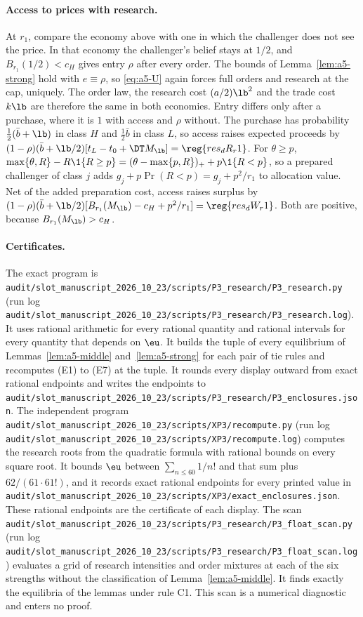 \paragraph{Access to prices with research.}
At \(r_1\), compare the economy above with one in which the challenger does not see the price. In that economy the
challenger's belief stays at \(1/2\), and \(B_{r_1}(1/2)<c_H\) gives entry \(\rho\) after every order. The bounds of
Lemma~\ref{lem:a5-strong} hold with \(e\equiv\rho\), so \eqref{eq:a5-U} again forces full orders and research at the
cap, uniquely. The order law, the research cost \((a/2)\lb^2\) and the trade cost \(k\lb\) are therefore the same in
both economies. Entry differs only after a purchase, where it is \(1\) with access and \(\rho\) without. The purchase
has probability \(\tfrac12(\bar b+\lb)\) in class \(H\) and \(\tfrac12\bar b\) in class \(L\), so access raises
expected proceeds by \((1-\rho)(\bar b+\lb/2)[t_L-t_0+\DT M_{\lb}]=\reg{res_dR_r1}\). For \(\theta\ge p\),
\(\max\{\theta,R\}-R\1\{R\ge p\}=(\theta-\max\{p,R\})_++p\1\{R<p\}\), so a prepared challenger of class \(j\) adds
\(g_j+p\Pr(R<p)=g_j+p^2/r_1\) to allocation value. Net of the added preparation cost, access raises surplus by
\((1-\rho)(\bar b+\lb/2)[B_{r_1}(M_{\lb})-c_H+p^2/r_1]=\reg{res_dW_r1}\). Both are positive, because
\(B_{r_1}(M_{\lb})>c_H\).

\paragraph{Certificates.}
The exact program is \nolinkurl{audit/slot_manuscript_2026_10_23/scripts/P3_research/P3_research.py} (run log
\nolinkurl{audit/slot_manuscript_2026_10_23/scripts/P3_research/P3_research.log}). It uses rational arithmetic for
every rational quantity and rational intervals for every quantity that depends on \(\eu\). It builds the tuple of
every equilibrium of Lemmas~\ref{lem:a5-middle} and~\ref{lem:a5-strong} for each pair of tie rules and recomputes
(E1) to (E7) at the tuple. It rounds every display outward from exact rational endpoints and writes the endpoints to
\nolinkurl{audit/slot_manuscript_2026_10_23/scripts/P3_research/P3_enclosures.json}. The independent program
\nolinkurl{audit/slot_manuscript_2026_10_23/scripts/XP3/recompute.py} (run log
\nolinkurl{audit/slot_manuscript_2026_10_23/scripts/XP3/recompute.log}) computes the research roots from the
quadratic formula with rational bounds on every square root. It bounds \(\eu\) between \(\sum_{n\le60}1/n!\) and that
sum plus \(62/(61\cdot61!)\), and it records exact rational endpoints for every printed value in
\nolinkurl{audit/slot_manuscript_2026_10_23/scripts/XP3/exact_enclosures.json}. These rational endpoints are the
certificate of each display. The scan
\nolinkurl{audit/slot_manuscript_2026_10_23/scripts/P3_research/P3_float_scan.py} (run log
\nolinkurl{audit/slot_manuscript_2026_10_23/scripts/P3_research/P3_float_scan.log}) evaluates a grid of research
intensities and order mixtures at each of the six strengths without the classification of
Lemma~\ref{lem:a5-middle}. It finds exactly the equilibria of the lemmas under rule C1. This scan is a numerical
diagnostic and enters no proof.
